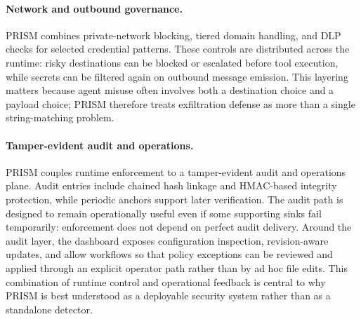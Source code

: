 \paragraph{Network and outbound governance.} PRISM combines private-network blocking, tiered domain handling, and DLP checks for selected credential patterns. These controls are distributed across the runtime: risky destinations can be blocked or escalated before tool execution, while secrets can be filtered again on outbound message emission. This layering matters because agent misuse often involves both a destination choice and a payload choice; PRISM therefore treats exfiltration defense as more than a single string-matching problem.

\paragraph{Tamper-evident audit and operations.} PRISM couples runtime enforcement to a tamper-evident audit and operations plane. Audit entries include chained hash linkage and HMAC-based integrity protection, while periodic anchors support later verification. The audit path is designed to remain operationally useful even if some supporting sinks fail temporarily: enforcement does not depend on perfect audit delivery. Around the audit layer, the dashboard exposes configuration inspection, revision-aware updates, and allow workflows so that policy exceptions can be reviewed and applied through an explicit operator path rather than by ad hoc file edits. This combination of runtime control and operational feedback is central to why PRISM is best understood as a deployable security system rather than as a standalone detector.
